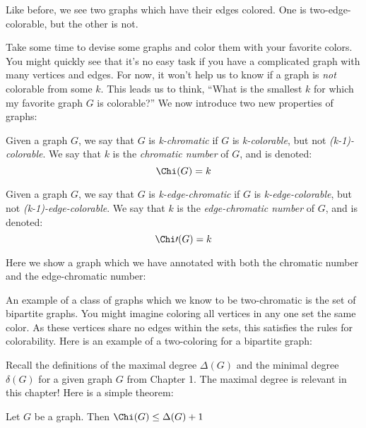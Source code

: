 Like before, we see two graphs which have their edges colored. One is two-edge-colorable, but the other is not.


Take some time to devise some graphs and color them with your favorite colors. You might quickly see that it's no easy task if you have a complicated graph with many vertices and edges. For now, it won't help us to know if a graph is \textit{not} colorable from some $k$. This leads us to think, ``What is the smallest $k$ for which my favorite graph $G$ is colorable?'' We now introduce two new properties of graphs:

\begin{definition}[K-Chromatic]
    Given a graph $G$, we say that $G$ is \textit{k-chromatic} if $G$ is \textit{k-colorable}, but not \textit{(k-1)-colorable}. We say that $k$ is the \textit{chromatic number} of $G$, and is denoted:
    \[\Chi(G) = k\]
\end{definition}

\begin{definition}
    Given a graph $G$, we say that $G$ is \textit{k-edge-chromatic} if $G$ is \textit{k-edge-colorable}, but not \textit{(k-1)-edge-colorable}. We say that $k$ is the \textit{edge-chromatic number} of $G$, and is denoted:
    \[ \Chi\prime(G) = k \]
\end{definition}

Here we show a graph which we have annotated with both the chromatic number and the edge-chromatic number:


An example of a class of graphs which we know to be two-chromatic is the set of bipartite graphs. You might imagine coloring all vertices in any one set the same color. As these vertices share no edges within the sets, this satisfies the rules for colorability. Here is an example of a two-coloring for a bipartite graph:


Recall the definitions of the maximal degree $\Delta(G)$ and the minimal degree $\delta(G)$ for a given graph $G$ from Chapter 1. The maximal degree is relevant in this chapter! Here is a simple theorem:

\begin{theorem}
    Let $G$ be a graph. Then $\Chi(G) \leq \Delta(G) + 1$
\end{theorem}
